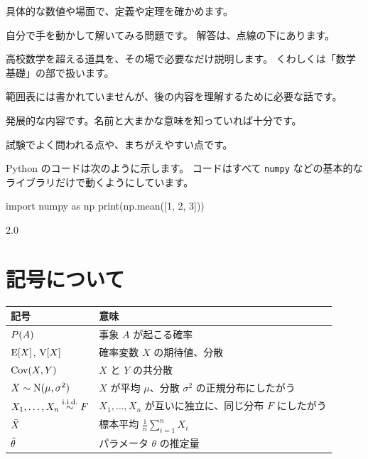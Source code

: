 \begin{example}
  具体的な数値や場面で、定義や定理を確かめます。
\end{example}

\begin{problem}
  自分で手を動かして解いてみる問題です。
  \tcblower
  解答は、点線の下にあります。
\end{problem}
\endgroup

\begin{mathnote}
  高校数学を超える道具を、その場で必要なだけ説明します。
  くわしくは「数学基礎」の部で扱います。
\end{mathnote}

\begin{supplement}
  範囲表には書かれていませんが、後の内容を理解するために必要な話です。
\end{supplement}

\begin{reference}
  発展的な内容です。名前と大まかな意味を知っていれば十分です。
\end{reference}

\begin{exampoint}
  試験でよく問われる点や、まちがえやすい点です。
\end{exampoint}

Python のコードは次のように示します。
コードはすべて \texttt{numpy} などの基本的なライブラリだけで動くようにしています。

\begin{pycode}
import numpy as np
print(np.mean([1, 2, 3]))
\end{pycode}

\begin{pyoutput}
2.0
\end{pyoutput}

\section*{記号について}

\begin{center}
  \begin{tabular}{ll}
    \toprule
    記号 & 意味 \\
    \midrule
    $P(A)$ & 事象 $A$ が起こる確率 \\
    $\mathrm{E}[X]$, $\mathrm{V}[X]$ & 確率変数 $X$ の期待値、分散 \\
    $\mathrm{Cov}(X,Y)$ & $X$ と $Y$ の共分散 \\
    $X \sim \mathrm{N}(\mu,\sigma^2)$ & $X$ が平均 $\mu$、分散 $\sigma^2$ の正規分布にしたがう \\
    $X_1,\dots,X_n \overset{\text{i.i.d.}}{\sim} F$ & $X_1,\dots,X_n$ が互いに独立に、同じ分布 $F$ にしたがう \\
    $\bar{X}$ & 標本平均 $\frac{1}{n}\sum_{i=1}^n X_i$ \\
    $\hat{\theta}$ & パラメータ $\theta$ の推定量 \\
    \bottomrule
  \end{tabular}
\end{center}
